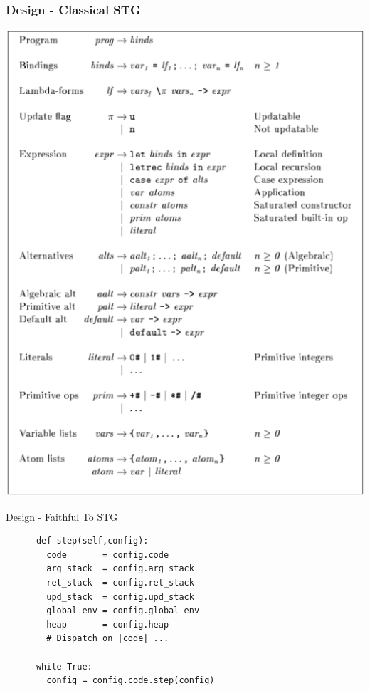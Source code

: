 \documentclass[xetex,serif,mathserif]{beamer}
\newenvironment{slide}[1]{\begin{frame}\frametitle{#1}}{\end{frame}}
\begin{document}
\begin{slide}{Design - Classical STG}
  \begin{center}
  \includegraphics[scale=0.3]{stg-def}
  \end{center}
\end{slide}

\begin{frame}[fragile]{Design - Faithful To STG}
  \begin{center}
    \begin{verbatim}
      def step(self,config):
        code       = config.code
        arg_stack  = config.arg_stack
        ret_stack  = config.ret_stack
        upd_stack  = config.upd_stack
        global_env = config.global_env
        heap       = config.heap
        # Dispatch on |code| ...

      while True:
        config = config.code.step(config)
    \end{verbatim}
  \end{center}
\end{frame}
\end{document}
